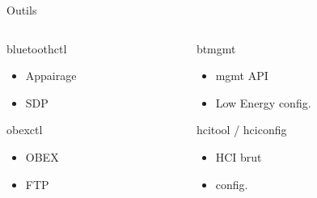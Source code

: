 \begin{frame}
\begin{center}\huge Outils\end{center}
	\begin{columns}[t]
		\begin{column}{0.50\linewidth}
			\begin{block}{bluetoothctl}
				\begin{itemize}
					\item Appairage
					\item SDP
				\end{itemize}
			\end{block}
			\begin{block}{obexctl}
				\begin{itemize}
					\item OBEX
					\item FTP
				\end{itemize}
			\end{block}
		\end{column}
		\begin{column}{0.50\linewidth}
			\begin{block}{btmgmt}
				\begin{itemize}
					\item mgmt API
					\item Low Energy config.
				\end{itemize}
			\end{block}
			\begin{block}{hcitool / hciconfig}
				\begin{itemize}
					\item HCI brut
					\item config.
				\end{itemize}
			\end{block}
		\end{column}
	\end{columns}
\end{frame}

